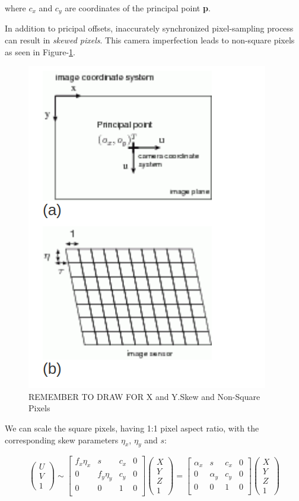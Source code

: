 \documentclass[a4paper]{report}
\numberwithin{figure}{section}
\begin{document}
where $c_x$ and $c_y$ are coordinates of the principal point \textbf{p}.

In addition to pricipal offsets, inaccurately synchronized pixel-sampling 
process can result in \textit{skewed pixels}. This camera imperfection leads to 
non-square pixels as seen in Figure-\ref{fig:skewed}.

\begin{figure}[H]
	\centering
  \includegraphics[width=0.5\linewidth,natwidth=640,natheight=640]
  {fig/ref_imgs/skew.png}
  \caption{REMEMBER TO DRAW FOR X and Y.Skew and Non-Square Pixels}
	\label{fig:skewed}
\end{figure}

We can scale the square pixels, having 1:1 pixel aspect ratio, with the 
corresponding skew parameters $\eta_x$, $\eta_y$ and $s$:

\begin{equation}
  \begin{pmatrix}
    U\\
    V\\
    1
  \end{pmatrix}
  \sim
  \begin{bmatrix}
    f_x\eta_x & s & c_x & 0\\
    0 & f_y\eta_y & c_y & 0\\
    0 & 0 & 1 & 0\\
  \end{bmatrix}
  \begin{pmatrix}
    X\\
    Y\\
    Z\\
    1
  \end{pmatrix}
  =
  \begin{bmatrix}
    \alpha_x & s & c_x & 0\\
    0 & \alpha_y & c_y & 0\\
    0 & 0 & 1 & 0\\
  \end{bmatrix}
  \begin{pmatrix}
    X\\
    Y\\
    Z\\
    1
  \end{pmatrix}
\end{equation} \label{eq:proj_func_w_square_pix_skew}
\end{document}
